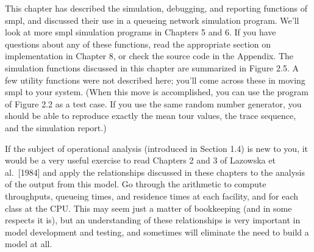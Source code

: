 This chapter has described the simulation, debugging, and reporting functions
of smpl, and discussed their use in a queueing network simulation program.
We'll look at more smpl simulation programs in Chapters 5 and 6. If you have
questions about any of these functions, read the appropriate section on
implementation in Chapter 8, or check the source code in the Appendix. The
simulation functions discussed in this chapter are summarized in Figure 2.5. A
few utility functions were not described here; you'll come across these in
moving smpl to your system. (When this move is accomplished, you can use the
program of Figure 2.2 as a test case. If you use the same random number
generator, you should be able to reproduce exactly the mean tour values, the
trace sequence, and the simulation report.)

If the subject of operational analysis (introduced in Section 1.4) is new to
you, it would be a very useful exercise to read Chapters 2 and 3 of Lazowska
et al.\ [1984] and apply the relationships discussed in these chapters to the
analysis of the output from this model. Go through the arithmetic to compute
throughputs, queueing times, and residence times at each facility, and for
 each class at the CPU. This may seem just a matter of bookkeeping (and in
some respects it is), but an understanding of these relationships is very
important in model development and testing, and sometimes will eliminate the
need to build a model at all.

